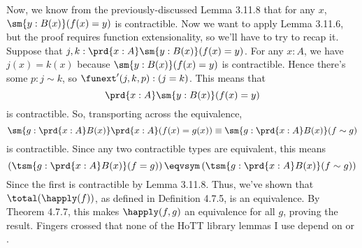 Now, we know from the previously-discussed Lemma 3.11.8 that for any $x$,
$\sm{y:B(x)} (f(x) = y)$ is contractible.  Now we want to apply Lemma 3.11.6,
but the proof requires function extensionality, so we'll have to try to recap
it.  Suppose that $j, k : \prd{x:A}\sm{y:B(x)}(f(x)=y)$.  For any $x : A$, we
have $j(x) = k(x)$ because $\sm{y:B(x)}(f(x) = y)$ is contractible.  Hence
there's some $p: j \sim k$, so $\funext'(j, k, p) : (j=k)$.  This means that
\[
  \prd{x:A}\sm{y:B(x)} (f(x) = y)
\]
is contractible.  So, transporting across the equivalence,
\[
  \sm{g:\prd{x:A}B(x)}\prd{x:A}(f(x) = g(x))
  \equiv
  \sm{g:\prd{x:A}B(x)}(f \sim g)
\]
is contractible.  Since any two contractible types are equivalent, this means
\[
  \left(\tsm{g:\prd{x:A}B(x)} (f=g)\right)   
  \eqvsym
  \left(\tsm{g:\prd{x:A}B(x)} (f \sim g)\right)   
\]
Since the first is contractible by Lemma 3.11.8.  Thus, we've shown
that $\total(\happly(f))$, as defined in Definition 4.7.5, is an
equivalence.  By Theorem 4.7.7, this makes $\happly(f, g)$ an
equivalence for all $g$, proving the result.  Fingers crossed that none of the
HoTT library lemmas I use depend on  or .
